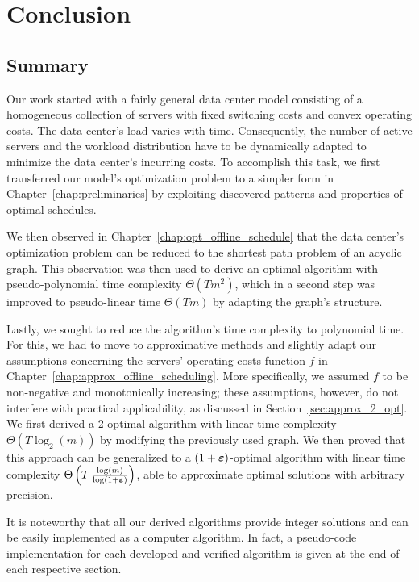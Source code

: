 
\chapter{Conclusion}\label{chap:conclusion}

\section{Summary}
Our work started with a fairly general data center model consisting of a homogeneous collection of servers with fixed switching costs and convex operating costs. The data center's load varies with time. Consequently, the number of active servers and the workload distribution have to be dynamically adapted to minimize the data center's incurring costs. To accomplish this task, we first transferred our model's optimization problem to a simpler form in Chapter~\ref{chap:preliminaries} by exploiting discovered patterns and properties of optimal schedules. 

We then observed in Chapter~\ref{chap:opt_offline_schedule} that the data center's optimization problem can be reduced to the shortest path problem of an acyclic graph. This observation was then used to derive an optimal algorithm with pseudo-polynomial time complexity $\Theta(Tm^2)$, which in a second step was improved to pseudo-linear time $\Theta(Tm)$ by adapting the graph's structure.

Lastly, we sought to reduce the algorithm's time complexity to polynomial time. For this, we had to move to approximative methods and slightly adapt our assumptions concerning the servers' operating costs function $f$ in Chapter~\ref{chap:approx_offline_scheduling}. More specifically, we assumed $f$ to be non-negative and monotonically increasing; these assumptions, however, do not interfere with practical applicability, as discussed in Section~\ref{sec:approx_2_opt}. We first derived a 2-optimal algorithm with linear time complexity $\Theta(T\log_2(m))$ by modifying the previously used graph. We then proved that this approach can be generalized to a $(1+\boldsymbol\varepsilon)$-optimal algorithm with linear time complexity $\Theta\left(T\,\frac{\log(m)}{\log(1+\boldsymbol\varepsilon)}\right)$, able to approximate optimal solutions with arbitrary precision.

It is noteworthy that all our derived algorithms provide integer solutions and can be easily implemented as a computer algorithm. In fact, a pseudo-code implementation for each developed and verified algorithm is given at the end of each respective section.


